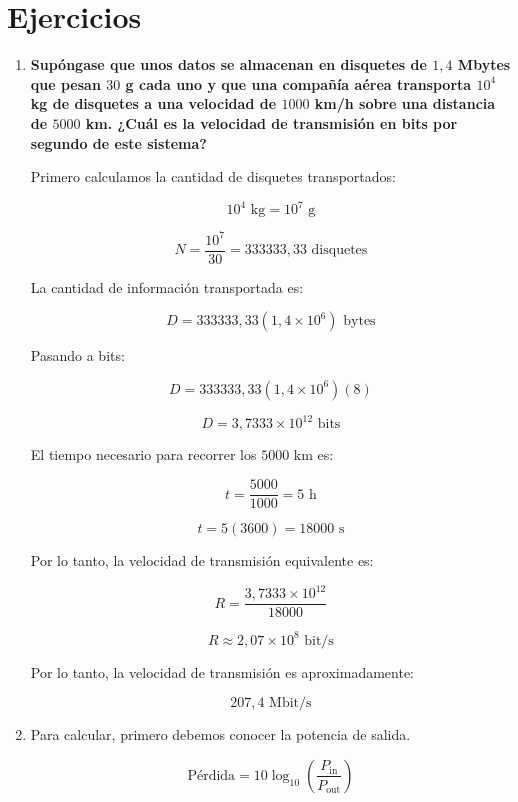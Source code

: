 \documentclass[11pt,a4paper]{article}
\begin{document}
\section*{Ejercicios}


\begin{enumerate}[label=4.\arabic*), itemsep=0.3cm]
  \item
        \textbf{Supóngase que unos datos se almacenan en disquetes de
          \(1,4\) Mbytes que pesan \(30\) g cada uno y que una compañía aérea
          transporta \(10^4\) kg de disquetes a una velocidad de \(1000\) km/h
          sobre una distancia de \(5000\) km. ¿Cuál es la velocidad de transmisión
          en bits por segundo de este sistema?}

        Primero calculamos la cantidad de disquetes transportados:

        \[
          10^4\text{ kg}=10^7\text{ g}
        \]

        \[
          N=\frac{10^7}{30}=333333,33\text{ disquetes}
        \]

        La cantidad de información transportada es:

        \[
          D=333333,33(1,4\times10^6)\text{ bytes}
        \]

        Pasando a bits:

        \[
          D=333333,33(1,4\times10^6)(8)
        \]

        \[
          D=3,7333\times10^{12}\text{ bits}
        \]

        El tiempo necesario para recorrer los \(5000\) km es:

        \[
          t=\frac{5000}{1000}=5\text{ h}
        \]

        \[
          t=5(3600)=18000\text{ s}
        \]

        Por lo tanto, la velocidad de transmisión equivalente es:

        \[
          R=\frac{3,7333\times10^{12}}{18000}
        \]

        \[
          \boxed{R\approx2,07\times10^8\text{ bit/s}}
        \]

        Por lo tanto, la velocidad de transmisión es aproximadamente:

        \[
          \boxed{207,4\text{ Mbit/s}}
        \]

  \item
        Para calcular, primero debemos conocer la potencia de salida.

        \[
          \text{Pérdida} = 10 \log_{10}\left(\frac{P_{\text{in}}}{P_{\text{out}}}\right)
        \]


\end{enumerate}
\end{document}
